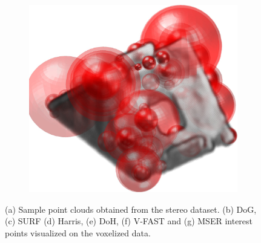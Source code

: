 \begin{figure}[ht]
\begin{subfigure}[t]{1\linewidth}
		\includegraphics[width=0.180\linewidth]{./fig/eval/bracket_mser.jpg} 
	\end{subfigure}
	\caption{(a) Sample point clouds obtained from the stereo dataset. (b) DoG, (c) SURF (d) Harris, (e) DoH, (f) V-FAST and (g) MSER interest points visualized on the voxelized data.}
	\label{fig/eval/mvs}
\end{figure}

